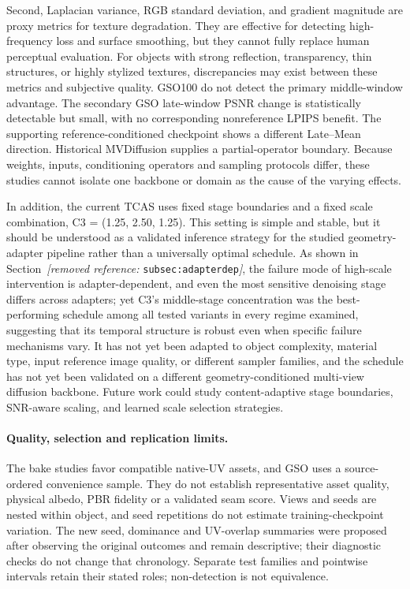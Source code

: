 \documentclass[times,twocolumn,final]{elsarticle}
\providecommand{\DIFadd}[1]{{\protect\color{blue} \sf #1}} %
\providecommand{\DIFdel}[1]{{\protect\color{red} \scriptsize #1}} %
\providecommand{\DIFaddbegin}{} %
\providecommand{\DIFaddend}{} %
\providecommand{\DIFdelbegin}{} %
\providecommand{\DIFdelend}{} %
\begin{document}
\DIFdel{Second, Laplacian variance, RGB standard deviation, and gradient magnitude are proxy metrics for texture degradation. They are effective for detecting high-frequency loss and surface smoothing, but they cannot fully replace human perceptual evaluation. For objects with strong reflection, transparency, thin structures, or highly stylized textures, discrepancies may exist between these metrics and subjective quality.
}\DIFdelend \DIFaddbegin \DIFadd{GSO100 do not detect the primary middle-window advantage. The secondary GSO late-window PSNR change is statistically detectable but small, with no corresponding nonreference LPIPS benefit. The supporting reference-conditioned checkpoint shows a different Late--Mean direction. Historical MVDiffusion supplies a partial-operator boundary. Because weights, inputs, conditioning operators and sampling protocols differ, these studies cannot isolate one backbone or domain as the cause of the varying effects.
}\DIFaddend 

\DIFdelbegin \DIFdel{In addition, the current TCAS uses fixed stage boundaries and a fixed scale combination, C3 = (1.25, 2.50, 1.25). This setting is simple and stable, but it should be understood as a validated inference strategy for the studied geometry-adapter pipeline rather than a universally optimal schedule. As shown in Section~\textit{[removed reference: }\texttt{subsec:adapterdep}\textit{]}, the failure mode of high-scale intervention is adapter-dependent, and even the most sensitive denoising stage differs across adapters; yet C3's middle-stage concentration was the best-performing schedule among all tested variants in every regime examined, suggesting that its temporal structure is robust even when specific failure mechanisms vary. It has not yet been adapted to object complexity, material type, input reference image quality, or different sampler families, and the schedule has not yet been validated on a different geometry-conditioned multi-view diffusion backbone. Future work could study content-adaptive stage boundaries, SNR-aware scaling, and learned scale selection strategies. }\DIFdelend \DIFaddbegin \paragraph{Quality, selection and replication limits.}
\DIFadd{The bake studies favor compatible native-UV assets, and GSO uses a source-ordered convenience sample. They do not establish representative asset quality, physical albedo, PBR fidelity or a validated seam score. Views and seeds are nested within object, and seed repetitions do not estimate training-checkpoint variation. The new seed, dominance and UV-overlap summaries were proposed after observing the original outcomes and remain descriptive; their diagnostic checks do not change that chronology. Separate test families and pointwise intervals retain their stated roles; non-detection is not equivalence.
}\DIFaddend 
\end{document}
